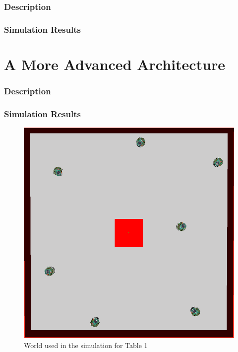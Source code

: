 \documentclass[a4paper]{article}
\begin{document}
\section{Description}



\section{Simulation Results}
\part{A More Advanced Architecture}

\section{Description}
\section{Simulation Results}




\begin{figure}[H]
\centering
\includegraphics[scale=0.5]{one-box-world.png}
\caption{World used in the simulation for Table 1}
\end{figure}



\newpage
{}


\end{document}
